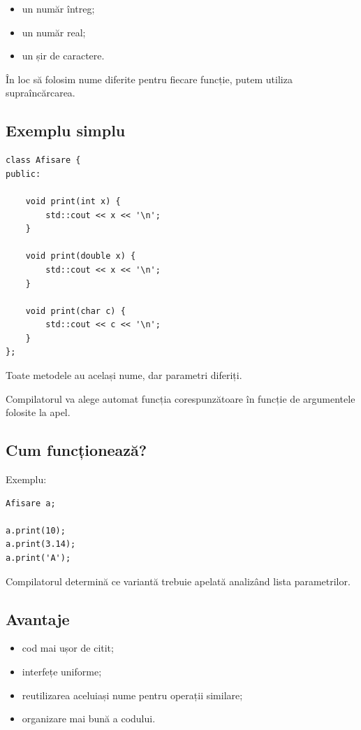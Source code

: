 \documentclass[12pt,a4paper]{article}
\begin{document}
\begin{itemize}
\item un număr întreg;
\item un număr real;
\item un șir de caractere.
\end{itemize}

În loc să folosim nume diferite pentru fiecare funcție, putem utiliza supraîncărcarea.

\subsection{Exemplu simplu}

\begin{verbatim}
class Afisare {
public:

    void print(int x) {
        std::cout << x << '\n';
    }

    void print(double x) {
        std::cout << x << '\n';
    }

    void print(char c) {
        std::cout << c << '\n';
    }
};
\end{verbatim}

Toate metodele au același nume, dar parametri diferiți.

Compilatorul va alege automat funcția corespunzătoare în funcție de argumentele folosite la apel.

\subsection{Cum funcționează?}

Exemplu:

\begin{verbatim}
Afisare a;

a.print(10);
a.print(3.14);
a.print('A');
\end{verbatim}

Compilatorul determină ce variantă trebuie apelată analizând lista parametrilor.

\subsection{Avantaje}

\begin{itemize}
\item cod mai ușor de citit;
\item interfețe uniforme;
\item reutilizarea aceluiași nume pentru operații similare;
\item organizare mai bună a codului.
\end{itemize}
\end{document}
